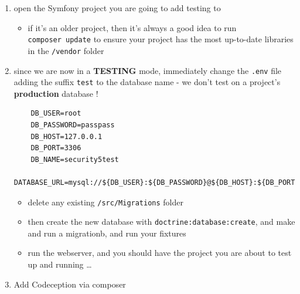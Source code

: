 \documentclass[a4paperpaper,openright]{book}
\newenvironment{Shaded}{}{}
\newcommand{\ExtensionTok}[1]{#1}
\newcommand{\NormalTok}[1]{#1}
\providecommand{\tightlist}{%
  \setlength{\itemsep}{0pt}\setlength{\parskip}{0pt}}
\begin{document}
\begin{enumerate}
\def\labelenumi{\arabic{enumi}.}
\item
  open the Symfony project you are going to add testing to

  \begin{itemize}
  \tightlist
  \item
    if it's an older project, then it's always a good idea to run
    \texttt{composer\ update} to ensure your project has the most
    up-to-date libraries in the \texttt{/vendor} folder
  \end{itemize}
\item
  since we are now in a \textbf{TESTING} mode, immediately change the
  \texttt{.env} file adding the suffix \texttt{test} to the database
  name - we don't test on a project's \textbf{production} database !

\begin{verbatim}
    DB_USER=root
    DB_PASSWORD=passpass
    DB_HOST=127.0.0.1
    DB_PORT=3306
    DB_NAME=security5test
    DATABASE_URL=mysql://${DB_USER}:${DB_PASSWORD}@${DB_HOST}:${DB_PORT}/${DB_NAME}
\end{verbatim}

  \begin{itemize}
  \item
    delete any existing \texttt{/src/Migrations} folder
  \item
    then create the new database with \texttt{doctrine:database:create},
    and make and run a migrationb, and run your fixtures
  \item
    run the webserver, and you should have the project you are about to
    test up and running \ldots{}
  \end{itemize}
\item
  Add Codeception via composer

\begin{Shaded}
\end{Shaded}
\end{enumerate}
\end{document}
